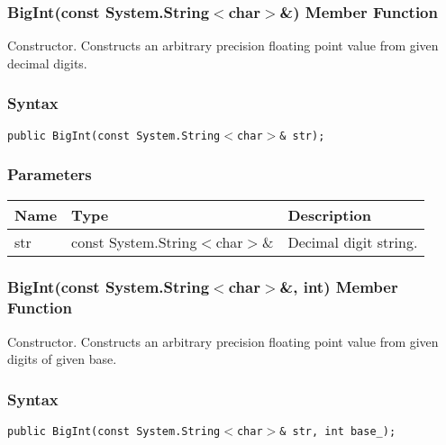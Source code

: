 \documentclass[a4paper,oneside,11.000000pt]{book}
\begin{document}
\hypertarget{System.Numerics.Multiprecision.BigInt.constructor.P.System.Numerics.Multiprecision.BigInt.C.R.System.String.char}{\subsubsection*{BigInt(const System.String$<$char$>$\&) Member Function}}
\begin{flushleft}
Constructor. Constructs an arbitrary precision floating point value from given decimal digits.

\end{flushleft}
\subsubsection*{Syntax}
\texttt{public BigInt(const System.String$<$char$>$\& str);}
\subsubsection*{Parameters}
\begin{flushleft}
\begin{supertabular}[l]{lll}
\textbf{Name}
& \textbf{Type}
& \textbf{Description}
\\
\hline
str
& const System.\-String$<$\-char$>$\-\&\-
& Decimal digit string.

\\
\end{supertabular}

\end{flushleft}
\clearpage

\hypertarget{System.Numerics.Multiprecision.BigInt.constructor.P.System.Numerics.Multiprecision.BigInt.C.R.System.String.char.int}{\subsubsection*{BigInt(const System.String$<$char$>$\&, int) Member Function}}
\begin{flushleft}
Constructor. Constructs an arbitrary precision floating point value from given digits of given base.

\end{flushleft}
\subsubsection*{Syntax}
\texttt{public BigInt(const System.String$<$char$>$\& str, int base\_);}
\end{document}
